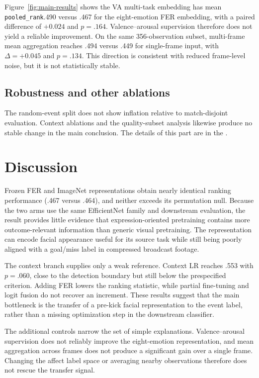 \documentclass{article}
\newcommand{\prank}{\texttt{pooled\_rank}}
\begin{document}
Figure~\ref{fig:main-results} shows the VA multi-task embedding has mean \prank .490 versus .467 for the eight-emotion FER embedding, with a paired difference of $+0.024$ and $p=.164$. Valence--arousal supervision therefore does not yield a reliable improvement. On the same 356-observation subset, multi-frame mean aggregation reaches .494 versus .449 for single-frame input, with $\Delta=+0.045$ and $p=.134$. This direction is consistent with reduced frame-level noise, but it is not statistically stable.

\subsection{Robustness and other ablations}

The random-event split does not show inflation relative to match-disjoint evaluation. Context ablations and the quality-subset analysis likewise produce no stable change in the main conclusion. The details of this part are in the \appendixautorefname.

\section{Discussion}

Frozen FER and ImageNet representations obtain nearly identical ranking performance (.467 versus .464), and neither exceeds its permutation null. Because the two arms use the same EfficientNet family and downstream evaluation, the result provides little evidence that expression-oriented pretraining contains more outcome-relevant information than generic visual pretraining. The representation can encode facial appearance useful for its source task while still being poorly aligned with a goal/miss label in compressed broadcast footage.

The context branch supplies only a weak reference. Context LR reaches .553 with $p=.060$, close to the detection boundary but still below the prespecified criterion. Adding FER lowers the ranking statistic, while partial fine-tuning and logit fusion do not recover an increment. These results suggest that the main bottleneck is the transfer of a pre-kick facial representation to the event label, rather than a missing optimization step in the downstream classifier.

The additional controls narrow the set of simple explanations. Valence--arousal supervision does not reliably improve the eight-emotion representation, and mean aggregation across frames does not produce a significant gain over a single frame. Changing the affect label space or averaging nearby observations therefore does not rescue the transfer signal. 
\end{document}
